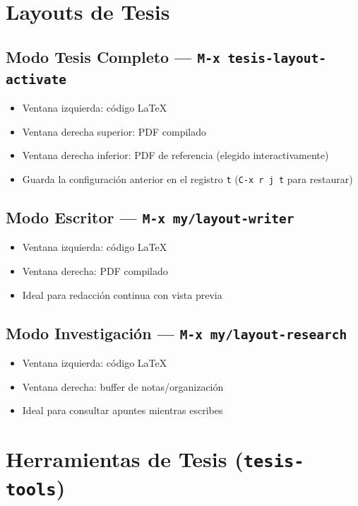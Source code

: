 \documentclass[11pt]{article}
\begin{document}
\section{Layouts de Tesis}
\label{sec:org4d08e11}

\subsection{Modo Tesis Completo — \texttt{M-x tesis-layout-activate}}
\label{sec:orgecec7d4}
\begin{itemize}
\item Ventana izquierda: código \LaTeX{}
\item Ventana derecha superior: PDF compilado
\item Ventana derecha inferior: PDF de referencia (elegido interactivamente)
\item Guarda la configuración anterior en el registro \texttt{t} (\texttt{C-x r j t} para restaurar)
\end{itemize}
\subsection{Modo Escritor — \texttt{M-x my/layout-writer}}
\label{sec:org451ed0d}
\begin{itemize}
\item Ventana izquierda: código \LaTeX{}
\item Ventana derecha: PDF compilado
\item Ideal para redacción continua con vista previa
\end{itemize}
\subsection{Modo Investigación — \texttt{M-x my/layout-research}}
\label{sec:org0c63111}
\begin{itemize}
\item Ventana izquierda: código \LaTeX{}
\item Ventana derecha: buffer de notas/organización
\item Ideal para consultar apuntes mientras escribes
\end{itemize}
\section{Herramientas de Tesis (\texttt{tesis-tools})}
\label{sec:org6bf2bbe}
\end{document}

